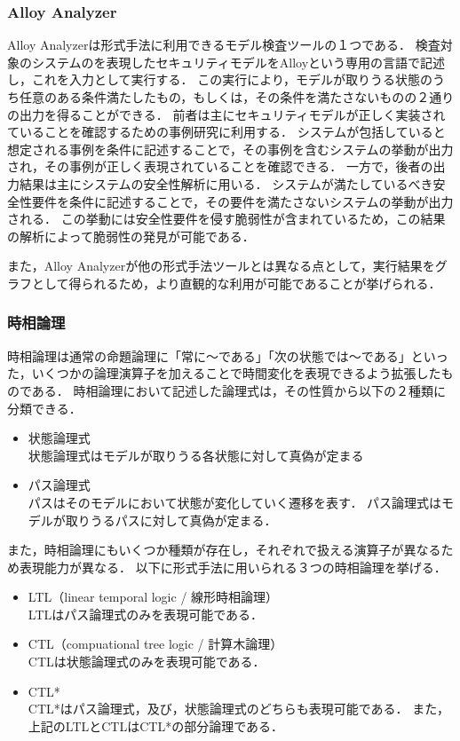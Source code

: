 \documentclass[journal]{IEEEtran}
\begin{document}
\subsubsection{Alloy Analyzer}
Alloy Analyzerは形式手法に利用できるモデル検査ツールの１つである．
検査対象のシステムのを表現したセキュリティモデルをAlloyという専用の言語で記述し，これを入力として実行する．
この実行により，モデルが取りうる状態のうち任意のある条件満たしたもの，もしくは，その条件を満たさないものの２通りの出力を得ることができる．
前者は主にセキュリティモデルが正しく実装されていることを確認するための事例研究に利用する．
システムが包括していると想定される事例を条件に記述することで，その事例を含むシステムの挙動が出力され，その事例が正しく表現されていることを確認できる．
一方で，後者の出力結果は主にシステムの安全性解析に用いる．
システムが満たしているべき安全性要件を条件に記述することで，その要件を満たさないシステムの挙動が出力される．
この挙動には安全性要件を侵す脆弱性が含まれているため，この結果の解析によって脆弱性の発見が可能である．

また，Alloy Analyzerが他の形式手法ツールとは異なる点として，実行結果をグラフとして得られるため，より直観的な利用が可能であることが挙げられる．

\subsubsection{時相論理}
\label{sec:TemporalLogic}
時相論理は通常の命題論理に「常に～である」「次の状態では～である」といった，いくつかの論理演算子を加えることで時間変化を表現できるよう拡張したものである．
時相論理において記述した論理式は，その性質から以下の２種類に分類できる．
\begin{itemize}
\item 状態論理式\\
状態論理式はモデルが取りうる各状態に対して真偽が定まる
\item パス論理式\\
パスはそのモデルにおいて状態が変化していく遷移を表す．
パス論理式はモデルが取りうるパスに対して真偽が定まる．
\end{itemize}

また，時相論理にもいくつか種類が存在し，それぞれで扱える演算子が異なるため表現能力が異なる．
以下に形式手法に用いられる３つの時相論理を挙げる．
\begin{itemize}
\item LTL（linear temporal logic / 線形時相論理）\\
LTLはパス論理式のみを表現可能である．
\item CTL（compuational tree logic / 計算木論理）\\
CTLは状態論理式のみを表現可能である．
\item CTL*\\
CTL*はパス論理式，及び，状態論理式のどちらも表現可能である．
また，上記のLTLとCTLはCTL*の部分論理である．
\end{itemize}
\end{document}
